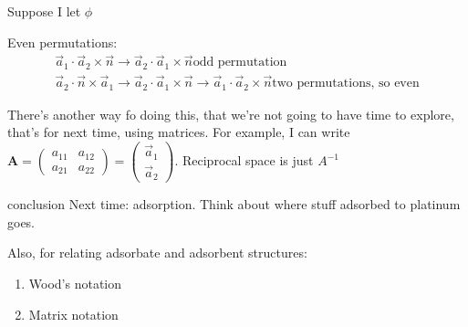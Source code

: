 \documentclass{article}
\newenvironment{aside}{\begin{mdframed}}{\end{mdframed}}
\newcommand{\matr}[1]{\bm{#1}}
\newcommand{\nvec}[0]{\vec{n}}
\newcommand{\aone}[0]{\vec{a}_1}
\newcommand{\atwo}[0]{\vec{a}_2}
\begin{document}
\begin{section}{Suppose I let $\phi$}
\begin{aside}
Even permutations:
\begin{align*}
	\aone\cdot\atwo\times\nvec \rightarrow \atwo\cdot\aone\times\nvec \text{odd permutation}\\
	\atwo\cdot\nvec\times\aone \rightarrow \atwo\cdot\aone\times\nvec \rightarrow \aone\cdot\atwo\times\nvec \text{two permutations, so even}
\end{align*}
\end{aside}
There's another way fo doing this, that we're not going to have time to explore, that's for next time, using matrices. For example, I can write $\matr{A} = \begin{pmatrix}a_{11} & a_{12}\\a_{21} & a_{22}\end{pmatrix} = \begin{pmatrix}\aone\\\atwo\end{pmatrix}$. Reciprocal space is just $A^{-1}$
\end{section}
\begin{section}{conclusion}
	Next time:
	adsorption. Think about where stuff adsorbed to platinum goes.

	Also, for relating adsorbate and adsorbent structures:
	\begin{enumerate}
		\item Wood's notation
		\item Matrix notation
	\end{enumerate}
\end{section}
	
\end{document}
